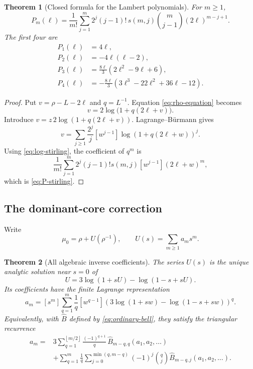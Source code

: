 \documentclass[11pt,a4paper]{article}
\numberwithin{equation}{section}
\newtheorem{theorem}{Theorem}[section]
\theoremstyle{definition}
\theoremstyle{remark}
\newcommand{\Bhat}{\widehat{B}}
\newcommand{\floor}[1]{\left\lfloor#1\right\rfloor}
\begin{document}
\begin{theorem}[Closed formula for the Lambert polynomials]\label{thm:P-stirling}
For $m\geq1$,
\begin{equation}\label{eq:P-stirling}
 \boxed{
 P_m(\ell)=\frac1{m!}\sum_{j=1}^{m}
 2^j(j-1)!\,s(m,j)\binom{m}{j-1}
 (2\ell)^{m-j+1}.}
\end{equation}
The first four are
\begin{align}
 P_1(\ell)&=4\ell,\nonumber\\
 P_2(\ell)&=-4\ell(\ell-2),\nonumber\\
 P_3(\ell)&=\frac{8\ell}{3}(2\ell^2-9\ell+6),
 \label{eq:P-first}\\
 P_4(\ell)&=-\frac{8\ell}{3}(3\ell^3-22\ell^2+36\ell-12).
 \nonumber
\end{align}
\end{theorem}

\begin{proof}
Put $v=\rho-L-2\ell$ and $q=L^{-1}$.  Equation
\eqref{eq:rho-equation} becomes
\begin{equation}\label{eq:v-rho-fixed}
 v=2\log\bigl(1+q(2\ell+v)\bigr).
\end{equation}
Introduce $v=z\,2\log(1+q(2\ell+v))$.  Lagrange--B\"urmann gives
\[
 v=\sum_{j\geq1}\frac{2^j}{j}[w^{j-1}]
 \log(1+q(2\ell+w))^j.
\]
Using \eqref{eq:log-stirling}, the coefficient of $q^m$ is
\[
 \frac1{m!}\sum_{j=1}^m2^j(j-1)!s(m,j)
 [w^{j-1}](2\ell+w)^m,
\]
which is \eqref{eq:P-stirling}.
\end{proof}

\subsection{The dominant-core correction}

Write
\begin{equation}\label{eq:mu0-U}
 \mu_0=\rho+U(\rho^{-1}),\qquad
 U(s)=\sum_{m\geq1}a_ms^m.
\end{equation}

\begin{theorem}[All algebraic inverse coefficients]\label{thm:a-coefficients}
The series $U(s)$ is the unique analytic solution near $s=0$ of
\begin{equation}\label{eq:U-fixed}
 \boxed{
 U=3\log(1+sU)-\log(1-s+sU).}
\end{equation}
Its coefficients have the finite Lagrange representation
\begin{equation}\label{eq:a-lagrange}
 \boxed{
 a_m=[s^m]\sum_{q=1}^{m}\frac1q[w^{q-1}]
 \left(3\log(1+sw)-\log(1-s+sw)\right)^q.}
\end{equation}
Equivalently, with $\Bhat$ defined by \eqref{eq:ordinary-bell}, they satisfy
the triangular recurrence
\begin{align}
 a_m={}&3\sum_{q=1}^{\floor{m/2}}
 \frac{(-1)^{q+1}}{q}\,
 \Bhat_{m-q,q}(a_1,a_2,\ldots)
 \label{eq:a-recurrence}\\
 &+\sum_{q=1}^{m}\frac1q
 \sum_{j=0}^{\min(q,m-q)}(-1)^j\binom qj
 \Bhat_{m-q,j}(a_1,a_2,\ldots).
 \nonumber
\end{align}
\end{theorem}
\end{document}
